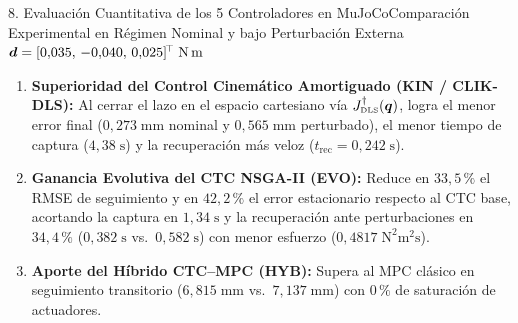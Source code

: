 \documentclass[aspectratio=169,10pt,xcolor=table]{beamer}
\newcommand{\T}{^{\!\top}}
\newcommand{\Jdls}{J^{\dagger}_{\text{\tiny DLS}}}
\begin{document}
\begin{frame}{8. Evaluación Cuantitativa de los 5 Controladores en MuJoCo}{Comparación Experimental en Régimen Nominal y bajo Perturbación Externa $\bm{d}=[0{,}035,\,-0{,}040,\,0{,}025]\T\;\text{N\,m}$}
\vspace{0.4mm}
\begin{cajaidea}
  \fontsize{5.9}{7.0}\selectfont
  \begin{enumerate}\setlength{\itemsep}{0.3pt}
    \item \textbf{Superioridad del Control Cinemático Amortiguado (KIN / CLIK-DLS):} Al cerrar el lazo en el espacio cartesiano vía $\Jdls(\bm{q})$, logra el menor error final (\textbf{$0{,}273\;\text{mm}$} nominal y \textbf{$0{,}565\;\text{mm}$} perturbado), el menor tiempo de captura (\textbf{$4{,}38\;\text{s}$}) y la recuperación más veloz (\textbf{$t_{\text{rec}}=0{,}242\;\text{s}$}).
    \item \textbf{Ganancia Evolutiva del CTC NSGA-II (EVO):} Reduce en \textbf{$33{,}5\,\%$} el RMSE de seguimiento y en \textbf{$42{,}2\,\%$} el error estacionario respecto al CTC base, acortando la captura en \textbf{$1{,}34\;\text{s}$} y la recuperación ante perturbaciones en \textbf{$34{,}4\,\%$} ($0{,}382\;\text{s}$ vs.\ $0{,}582\;\text{s}$) con menor esfuerzo ($0{,}4817\;\text{N}^2\text{m}^2\text{s}$).
    \item \textbf{Aporte del Híbrido CTC--MPC (HYB):} Supera al MPC clásico en seguimiento transitorio ($6{,}815\;\text{mm}$ vs.\ $7{,}137\;\text{mm}$) con $0\,\%$ de saturación de actuadores.
  \end{enumerate}
\end{cajaidea}
\end{frame}
\end{document}
